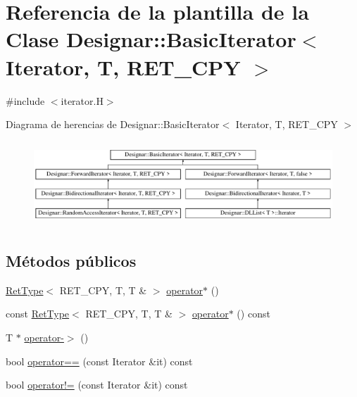 \hypertarget{class_designar_1_1_basic_iterator}{}\section{Referencia de la plantilla de la Clase Designar\+:\+:Basic\+Iterator$<$ Iterator, T, R\+E\+T\+\_\+\+C\+PY $>$}
\label{class_designar_1_1_basic_iterator}


{\ttfamily \#include $<$iterator.\+H$>$}

Diagrama de herencias de Designar\+:\+:Basic\+Iterator$<$ Iterator, T, R\+E\+T\+\_\+\+C\+PY $>$\begin{figure}[H]
\begin{center}
\leavevmode
\includegraphics[height=3.209169cm]{class_designar_1_1_basic_iterator}
\end{center}
\end{figure}
\subsection*{Métodos públicos}
\begin{DoxyCompactItemize}
\item 
\hyperlink{namespace_designar_ab937f9c4bf5f1d0e65dbc616245d50ee}{Ret\+Type}$<$ R\+E\+T\+\_\+\+C\+PY, T, T \& $>$ \hyperlink{class_designar_1_1_basic_iterator_aed614b1aca7f9cb1552699b106bb281f}{operator$\ast$} ()
\item 
const \hyperlink{namespace_designar_ab937f9c4bf5f1d0e65dbc616245d50ee}{Ret\+Type}$<$ R\+E\+T\+\_\+\+C\+PY, T, T \& $>$ \hyperlink{class_designar_1_1_basic_iterator_aa016cf79d8fd6b3e9f73c3dbbbaf7a31}{operator$\ast$} () const
\item 
T $\ast$ \hyperlink{class_designar_1_1_basic_iterator_ac87226512fbbe7c524cc0be8ae2ee914}{operator-\/$>$} ()
\item 
bool \hyperlink{class_designar_1_1_basic_iterator_abaca601c4d1d4ff27429426437abbf02}{operator==} (const Iterator \&it) const
\item 
bool \hyperlink{class_designar_1_1_basic_iterator_aea51bca6ffed62c081aefbcb804a21f1}{operator!=} (const Iterator \&it) const
\end{DoxyCompactItemize}
